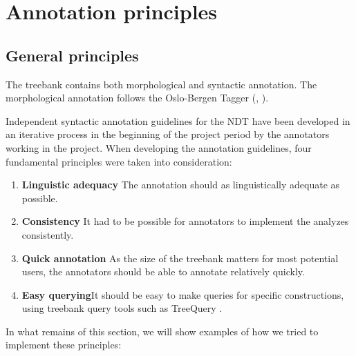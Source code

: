 \documentclass[11pt,a4paper]{article}
\begin{document}

\section{Annotation principles}
\subsection{General principles}


The treebank contains both morphological and syntactic annotation. The morphological annotation follows the Oslo-Bergen Tagger (\cite{Hag:Joh:Nok:00}, \cite<see also>{Sol:2013}).

Independent syntactic annotation guidelines for the NDT have been developed in an iterative process in the beginning of the project period by the annotators working in the project\cite{Kin:Sol:Eri:2013}. When developing the annotation guidelines, four fundamental principles were taken into consideration:
\begin{enumerate}
 \item \textbf{Linguistic adequacy} The annotation should as linguistically adequate as possible.
 \item \textbf{Consistency} It had to be possible for annotators to implement the analyzes consistently.
 \item \textbf{Quick annotation} As the size of the treebank matters for most potential users, the annotators should be able to annotate relatively quickly.
 \item \textbf{Easy querying}It should be easy to make queries for specific constructions, using treebank query tools such as TreeQuery \cite{Paj:Ste:09}.
\end{enumerate}
In what remains of this section, we will show examples of how we tried to implement these principles:
\end{document}
